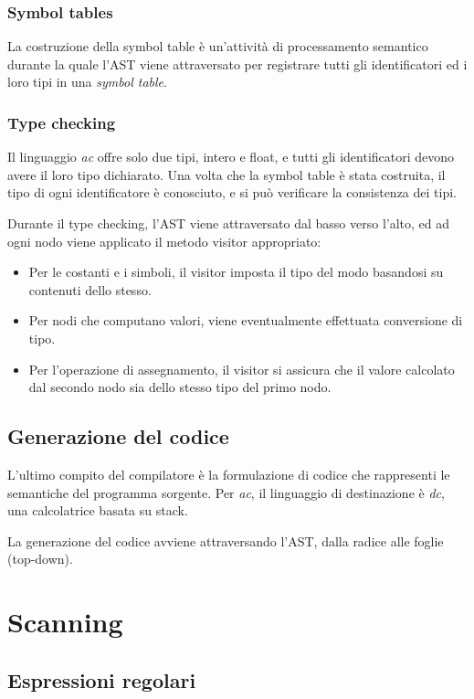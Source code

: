 \documentclass[11pt]{article}
\begin{document}
\subsubsection{Symbol tables}
La costruzione della symbol table è un'attività di processamento semantico durante la quale l'AST viene attraversato per 
registrare tutti gli identificatori ed i loro tipi in una \textit{symbol table}.
\subsubsection{Type checking}
Il linguaggio \textit{ac} offre solo due tipi, intero e float, e tutti gli identificatori devono avere il loro tipo 
dichiarato. Una volta che la symbol table è stata costruita, il tipo di ogni identificatore è conosciuto, e si può verificare 
la consistenza dei tipi.

Durante il type checking, l'AST viene attraversato dal basso verso l'alto, ed ad ogni nodo viene applicato il metodo 
visitor appropriato:
\begin{itemize}
    \item Per le costanti e i simboli, il visitor imposta il tipo del modo basandosi su contenuti dello stesso.
    \item Per nodi che computano valori, viene eventualmente effettuata conversione di tipo.
    \item Per l'operazione di assegnamento, il visitor si assicura che il valore calcolato dal secondo nodo sia dello 
    stesso tipo del primo nodo.
\end{itemize}
\subsection{Generazione del codice}
L'ultimo compito del compilatore è la formulazione di codice che rappresenti le semantiche del programma sorgente. 
Per \textit{ac}, il linguaggio di destinazione è \textit{dc}, una calcolatrice basata su stack. 

La generazione del codice avviene attraversando l'AST, dalla radice alle foglie (top-down).
\section{Scanning}
\subsection{Espressioni regolari}
\end{document}
